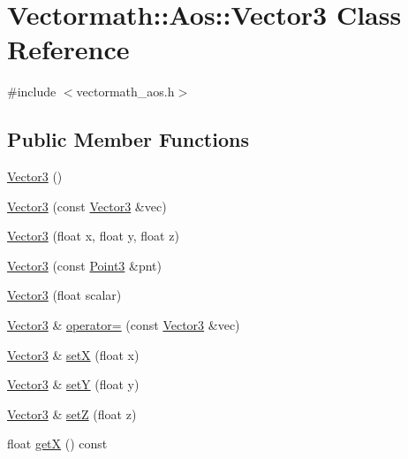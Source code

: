 \hypertarget{classVectormath_1_1Aos_1_1Vector3}{\section{Vectormath\-:\-:Aos\-:\-:Vector3 Class Reference}
\label{classVectormath_1_1Aos_1_1Vector3}
}


{\ttfamily \#include $<$vectormath\-\_\-aos.\-h$>$}

\subsection*{Public Member Functions}
\begin{DoxyCompactItemize}
\item 
\hyperlink{classVectormath_1_1Aos_1_1Vector3_a75e3a3309e5d205fc1ce9fc04822df7c}{Vector3} ()
\item 
\hyperlink{classVectormath_1_1Aos_1_1Vector3_ab31fe52fc7f99fed0017b3dab88d3901}{Vector3} (const \hyperlink{classVectormath_1_1Aos_1_1Vector3}{Vector3} \&vec)
\item 
\hyperlink{classVectormath_1_1Aos_1_1Vector3_ae964bdcddf8a714f0a0153112ec29539}{Vector3} (float x, float y, float z)
\item 
\hyperlink{classVectormath_1_1Aos_1_1Vector3_a1d0fd7e451ce2d15c5f4a779121eb21b}{Vector3} (const \hyperlink{classVectormath_1_1Aos_1_1Point3}{Point3} \&pnt)
\item 
\hyperlink{classVectormath_1_1Aos_1_1Vector3_a25754eabd1008dc63ba5584e09e9ceb3}{Vector3} (float scalar)
\item 
\hyperlink{classVectormath_1_1Aos_1_1Vector3}{Vector3} \& \hyperlink{classVectormath_1_1Aos_1_1Vector3_a87eaa68196ca23d9d81e219786cbf73e}{operator=} (const \hyperlink{classVectormath_1_1Aos_1_1Vector3}{Vector3} \&vec)
\item 
\hyperlink{classVectormath_1_1Aos_1_1Vector3}{Vector3} \& \hyperlink{classVectormath_1_1Aos_1_1Vector3_ae19a44e6f421c6be30a47c7192a1bf8d}{set\-X} (float x)
\item 
\hyperlink{classVectormath_1_1Aos_1_1Vector3}{Vector3} \& \hyperlink{classVectormath_1_1Aos_1_1Vector3_aa7307ab2f597a7e7a97eb0b8239b14c8}{set\-Y} (float y)
\item 
\hyperlink{classVectormath_1_1Aos_1_1Vector3}{Vector3} \& \hyperlink{classVectormath_1_1Aos_1_1Vector3_ae1c113d3dabcc3646b9c7384bd3ef6c0}{set\-Z} (float z)
\item 
float \hyperlink{classVectormath_1_1Aos_1_1Vector3_a4ba3eab35f3856eba129e2f5067b5f63}{get\-X} () const 

\end{DoxyCompactItemize}
